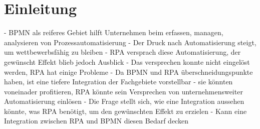 \chapter{Einleitung}
- BPMN als reiferes Gebiet hilft Unternehmen beim erfassen, managen, analysieren von Prozessautomatisierung
- Der Druck nach Automatisierung steigt, um wettbewerbsfähig zu bleiben
- RPA versprach diese Automatisierung, der gewünscht Effekt blieb jedoch Ausblick
- Das versprechen konnte nicht eingelöst werden, RPA hat einige Probleme
- Da BPMN und RPA überschneidungspunkte haben, ist eine tiefere Integration der Fachgebiete vorstellbar
- sie könnten voneinader profitieren, RPA könnte sein Versprechen von unternehmensweiter Automatisierung einlösen
- Die Frage stellt sich, wie eine Integration aussehen könnte, was RPA benötigt, um den gewünschten Effekt zu erzielen
- Kann eine Integration zwischen RPA und BPMN diesen Bedarf decken

